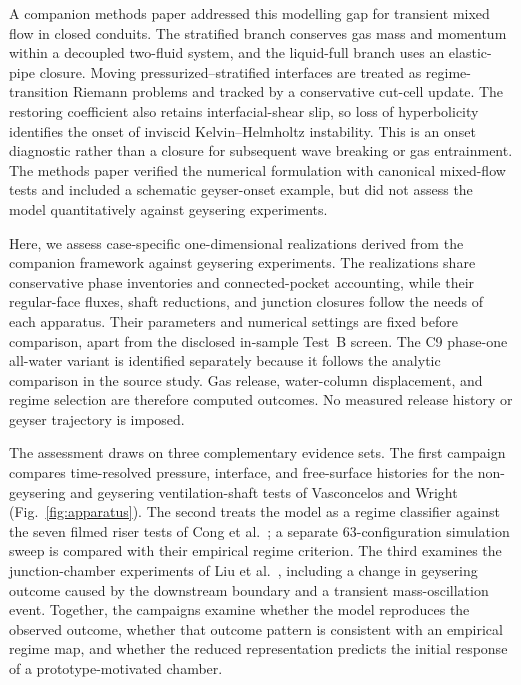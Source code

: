 A companion methods paper \cite{xue2026model} addressed this modelling gap for
transient mixed flow in closed conduits. The stratified branch conserves gas
mass and momentum within a decoupled two-fluid system, and the liquid-full
branch uses an elastic-pipe closure. Moving pressurized--stratified interfaces
are treated as regime-transition Riemann problems and tracked by a conservative
cut-cell update. The restoring coefficient also retains interfacial-shear
slip, so loss of hyperbolicity identifies the onset of inviscid
Kelvin--Helmholtz instability. This is an onset diagnostic rather than a
closure for subsequent wave breaking or gas entrainment. The methods paper
verified the numerical formulation with canonical mixed-flow tests and
included a schematic geyser-onset example, but did not assess the model
quantitatively against geysering experiments.

Here, we assess case-specific one-dimensional realizations derived from the
companion framework against geysering experiments. The realizations share
conservative phase inventories and connected-pocket accounting, while their
regular-face fluxes, shaft reductions, and junction closures follow the needs
of each apparatus. Their parameters and numerical settings are fixed before comparison,
apart from the disclosed in-sample Test~B screen. The C9 phase-one all-water
variant is identified separately because it follows the analytic comparison in
the source study. Gas release, water-column displacement, and regime selection
are therefore computed outcomes. No measured release history or geyser
trajectory is imposed.

The assessment draws on three complementary evidence sets. The first campaign
compares time-resolved pressure, interface, and free-surface histories for the
non-geysering and geysering ventilation-shaft tests of
Vasconcelos and Wright \cite{vasconcelos2011}
(Fig.~\ref{fig:apparatus}). The second treats the model as
a regime classifier against the seven filmed riser tests of Cong et al.\
\cite{cong2017}; a separate 63-configuration simulation sweep is compared with
their empirical regime criterion. The third examines the junction-chamber
experiments of Liu et al.\ \cite{liu2020}, including a change in geysering
outcome caused by the downstream boundary and a transient mass-oscillation
event. Together, the campaigns examine whether the model reproduces the
observed outcome, whether that outcome pattern is consistent with an empirical
regime map, and whether the reduced representation predicts the initial
response of a prototype-motivated chamber.

